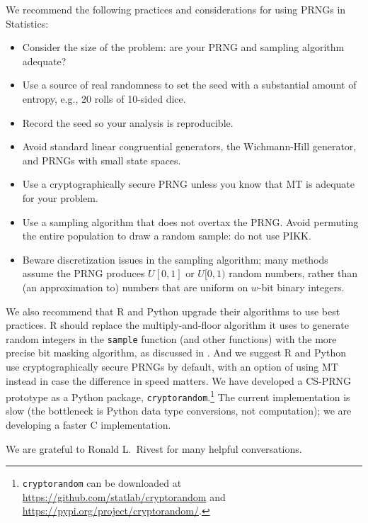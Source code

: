 \documentclass[graybox]{svmult}
\begin{document}
We recommend the following practices and considerations for using PRNGs in Statistics:
\begin{itemize}
\item Consider the size of the problem: are your PRNG and sampling algorithm adequate?
\item Use a source of real randomness to set the seed with a substantial amount of entropy, e.g., 20 rolls of 10-sided dice.
\item Record the seed so your analysis is reproducible.
\item Avoid standard linear congruential generators, the Wichmann-Hill generator, and PRNGs with small state spaces.
\item Use a cryptographically secure PRNG unless you know that MT is adequate for your problem.
\item Use a sampling algorithm that does not overtax the PRNG. Avoid permuting the entire population to draw a random sample: do not use PIKK.
\item Beware discretization issues in the sampling algorithm; many methods assume the PRNG produces $U[0,1]$ or $U[0,1)$ random numbers, rather than (an approximation to) numbers that are uniform on $w$-bit binary integers.
\end{itemize}


We also recommend that R and Python upgrade their algorithms to use best practices.
R should replace the multiply-and-floor algorithm it uses to generate random integers in the \texttt{sample} function (and other functions) with the more precise bit masking algorithm, as discussed
in \cite{ottoboniStark18}.
And we suggest R and Python use cryptographically secure PRNGs by default, with an option of using MT instead in case the difference in speed matters.
We have developed a CS-PRNG prototype as a Python package, \texttt{cryptorandom}.\footnote{ %
\texttt{cryptorandom} can be downloaded at \url{https://github.com/statlab/cryptorandom} and \url{https://pypi.org/project/cryptorandom/}.
} %
The current implementation is slow (the bottleneck is Python data type conversions, not computation);
we are developing a faster C implementation.

\begin{acknowledgement}
We are grateful to Ronald L.~Rivest for many helpful conversations.
\end{acknowledgement}




\end{document}
